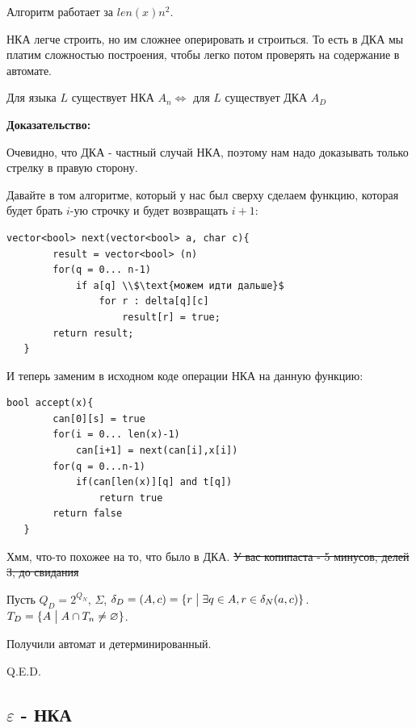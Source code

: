 Алгоритм работает за $len(x) n^2$. 

НКА легче строить, но им сложнее оперировать и строиться. То есть в ДКА мы платим сложностью построения, чтобы легко потом проверять на содержание в автомате.


Для языка $L$ существует НКА $A_n \Leftrightarrow$ для $L$ существует ДКА $A_D$

\textbf{Доказательство:}

    Очевидно, что ДКА - частный случай НКА, поэтому нам надо доказывать только стрелку в правую сторону.


    Давайте в том алгоритме, который у нас был сверху сделаем функцию, которая будет брать $i$-ую строчку и будет возвращать $i+1$:
    
    \begin{lstlisting}[mathescape]
     vector<bool> next(vector<bool> a, char c){
        result = vector<bool> (n)
        for(q = 0... n-1)
            if a[q] \\$\text{можем идти дальше}$
                for r : delta[q][c]
                    result[r] = true;
        return result;
   }
    \end{lstlisting}

    И теперь заменим в исходном коде операции НКА на данную функцию:

    \begin{lstlisting}[mathescape]
   bool accept(x){
        can[0][s] = true
        for(i = 0... len(x)-1)
            can[i+1] = next(can[i],x[i])
        for(q = 0...n-1)
            if(can[len(x)][q] and t[q])
                return true
        return false
   }
\end{lstlisting}

    Хмм, что-то похожее на то, что было в ДКА. \sout{У вас копипаста - 5 минусов, делей 3, до свидания}

    Пусть $Q_D = 2^{Q_N}$, $\Sigma$,  $\delta_{D} =(A,c) = \{r \bigm| \exists q \in A, r \in \delta_N(a,c)\}$. $T_D = \{A \bigm| A \cap T_n \neq \varnothing\}$. 
    
    Получили автомат и детерминированный.
    
\hfill Q.E.D.

\subsection{$\varepsilon$ - НКА}


